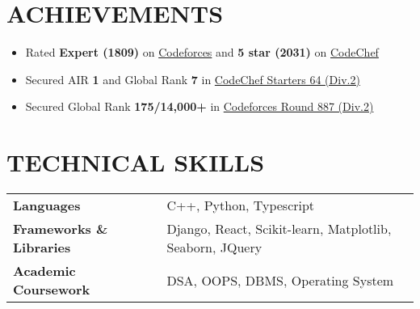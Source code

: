 \documentclass[12pt]{article}
\begin{document}
\section*{ACHIEVEMENTS}
\begin{itemize}[leftmargin=20pt, topsep=0.5pt, itemsep=0.5pt, partopsep=0.5pt, parsep=0.5pt]
    \item Rated \textbf{Expert (1809)} on \href{https://codeforces.com/profile/prabhavagrawal7}{Codeforces} and \textbf{5 star (2031)} on \href{https://www.codechef.com/users/prabhav7}{CodeChef}
    \item Secured AIR \textbf{1} and Global Rank \textbf{7} in \href{https://www.codechef.com/rankings/START64B?filterBy=Country%3DIndia&itemsPerPage=100}{CodeChef Starters 64 (Div.2)}
    \item Secured Global Rank \textbf{175/14,000+} in \href{https://codeforces.com/contest/1853/standings/participant/159682595#p159682595}{Codeforces Round 887 (Div.2)}
\end{itemize}


\section*{TECHNICAL SKILLS}
{\small
	\begin{tabular}{@{}llll}
		\textbf{Languages}               &   & C++, Python, Typescript                            \\
		\textbf{Frameworks \& Libraries} &   & Django, React, Scikit-learn, Matplotlib, Seaborn, JQuery \\
		\textbf{Academic Coursework}     &   & DSA, OOPS, DBMS, Operating System                            \\
	\end{tabular}
}
\end{document}
